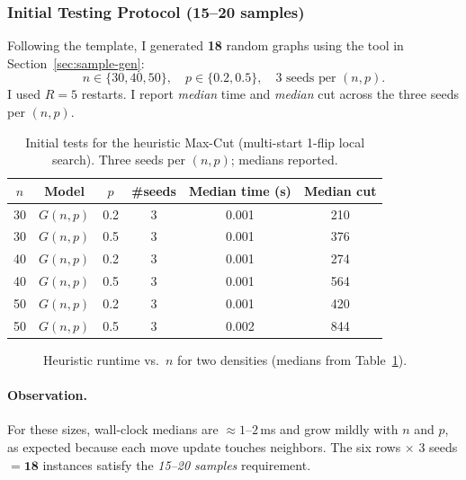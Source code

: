 \documentclass[12pt]{article}
\begin{document}
\subsubsection*{Initial Testing Protocol (15–20 samples)}
Following the template, I generated \textbf{18} random graphs using the tool in Section~\ref{sec:sample-gen}:
\[
n \in \{30,40,50\},\quad p \in \{0.2,0.5\},\quad \text{3 seeds per }(n,p).
\]
I used $R=5$ restarts. I report \emph{median} time and \emph{median} cut across the three seeds per $(n,p)$.

\begin{table}[H]
\centering
\caption{Initial tests for the heuristic Max-Cut (multi-start 1-flip local search).
Three seeds per $(n,p)$; medians reported.}
\label{tab:heuristic-initial}
\begin{tabular}{@{}cccccc@{}}
\toprule
$n$ & Model & $p$ & \#seeds & Median time (s) & Median cut \\ \midrule
30 & $G(n,p)$ & 0.2 & 3 & 0.001 & 210 \\
30 & $G(n,p)$ & 0.5 & 3 & 0.001 & 376 \\
40 & $G(n,p)$ & 0.2 & 3 & 0.001 & 274 \\
40 & $G(n,p)$ & 0.5 & 3 & 0.001 & 564 \\
50 & $G(n,p)$ & 0.2 & 3 & 0.001 & 420 \\
50 & $G(n,p)$ & 0.5 & 3 & 0.002 & 844 \\
\bottomrule
\end{tabular}
\end{table}

\begin{figure}[H]
\centering
{}
\caption{Heuristic runtime vs.\ $n$ for two densities (medians from Table~\ref{tab:heuristic-initial}).}
\label{fig:heuristic-times}
\end{figure}

\paragraph{Observation.}
For these sizes, wall-clock medians are $\approx\!1$–$2$\,ms and grow mildly with $n$ and $p$, as expected because each move update touches neighbors. The six rows $\times$ 3 seeds $=\mathbf{18}$ instances satisfy the \emph{15–20 samples} requirement.
\end{document}
